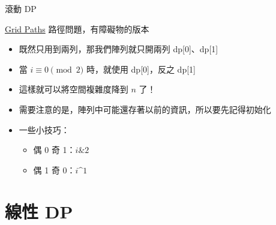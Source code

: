 \documentclass[aspectratio=169]{beamer}
\begin{document}
    \begin{frame}{滾動 DP}
        \begin{block}{\href{https://cses.fi/problemset/task/1638}{Grid Paths}}
            路徑問題，有障礙物的版本
        \end{block}

        \begin{itemize}
            \item<1-> 既然只用到兩列，那我們陣列就只開兩列 dp[0]、dp[1]
            \item<2-> 當 $i \equiv 0 \pmod{2}$ 時，就使用 dp[0]，反之 dp[1]
            \item<2-> 這樣就可以將空間複雜度降到 $n$ 了！
            \item<3-> 需要注意的是，陣列中可能還存著以前的資訊，所以要先記得初始化
            \item<4-> 一些小技巧：
            \begin{itemize}
                \item<4-> 偶 0 奇 1：$i \& 2$
                \item<4-> 偶 1 奇 0：$i \^ 1$
            \end{itemize}
        \end{itemize}
    \end{frame}


    \section{線性 DP}
\end{document}
